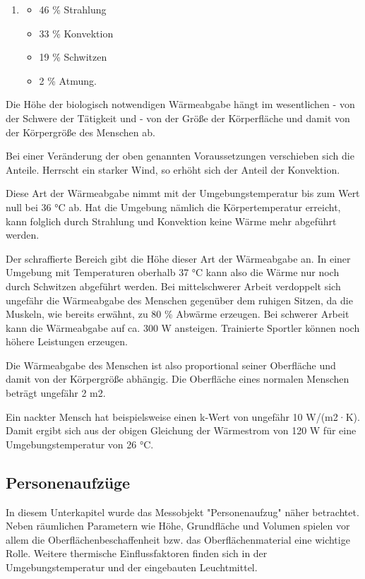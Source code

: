\begin{enumerate}
\item 
\begin{itemize}
	\item  46 \% Strahlung
	\item  33 \% Konvektion
	\item  19 \% Schwitzen
	\item   2 \% Atmung.
\end{itemize}
\end{enumerate}	


Die Höhe der biologisch notwendigen Wärmeabgabe hängt im wesentlichen
- von der Schwere der Tätigkeit und
- von der Größe der Körperfläche und damit von der Körpergröße des Menschen ab.


Bei einer Veränderung der oben genannten Voraussetzungen verschieben sich die Anteile.
Herrscht ein starker Wind, so erhöht sich der Anteil der Konvektion.

Diese Art der Wärmeabgabe nimmt mit der Umgebungstemperatur bis zum Wert null bei 36 °C ab. Hat die Umgebung nämlich die
Körpertemperatur erreicht, kann folglich durch Strahlung und Konvektion keine Wärme mehr
abgeführt werden.

Der schraffierte Bereich gibt die Höhe dieser Art der
Wärmeabgabe an. In einer Umgebung mit Temperaturen oberhalb 37 °C kann also die Wärme
nur noch durch Schwitzen abgeführt werden. Bei mittelschwerer Arbeit verdoppelt sich
ungefähr die Wärmeabgabe des Menschen gegenüber dem ruhigen Sitzen, da die Muskeln,
wie bereits erwähnt, zu 80 \% Abwärme erzeugen. Bei schwerer Arbeit kann die Wärmeabgabe auf ca. 300 W ansteigen. Trainierte Sportler können noch höhere Leistungen erzeugen.

Die
Wärmeabgabe des Menschen ist also proportional seiner Oberfläche und damit von der Körpergröße abhängig. Die Oberfläche eines normalen Menschen beträgt ungefähr 2 m2.

Ein nackter Mensch hat beispielsweise einen k-Wert von
ungefähr 10 W/(m2·K). Damit ergibt sich aus der obigen Gleichung der Wärmestrom von 120
W für eine Umgebungstemperatur von 26 °C. \cite{MenschWaerme}

\subsection{Personenaufzüge}

In diesem Unterkapitel wurde das Messobjekt "Personenaufzug" näher betrachtet. Neben räumlichen Parametern wie Höhe, Grundfläche und Volumen spielen vor allem die Oberflächenbeschaffenheit bzw. das Oberflächenmaterial eine wichtige Rolle. Weitere thermische Einflussfaktoren finden sich in der Umgebungstemperatur und der eingebauten Leuchtmittel.



